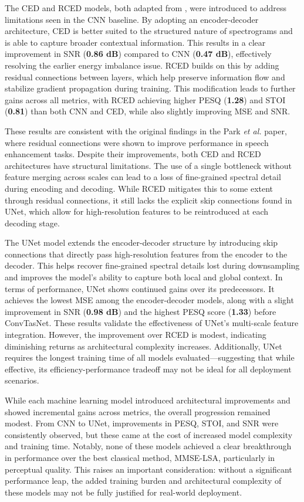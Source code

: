 The CED and RCED models, both adapted from \cite{park2017acoustic}, were introduced to address limitations seen in the CNN baseline. By adopting an encoder-decoder architecture, CED is better suited to the structured nature of spectrograms and is able to capture broader contextual information. This results in a clear improvement in SNR (\textbf{0.86 dB}) compared to CNN (\textbf{0.47 dB}), effectively resolving the earlier energy imbalance issue. RCED builds on this by adding residual connections between layers, which help preserve information flow and stabilize gradient propagation during training. This modification leads to further gains across all metrics, with RCED achieving higher PESQ (\textbf{1.28}) and STOI (\textbf{0.81}) than both CNN and CED, while also slightly improving MSE and SNR.

These results are consistent with the original findings in the Park \textit{et al.} paper, where residual connections were shown to improve performance in speech enhancement tasks. Despite their improvements, both CED and RCED architectures have structural limitations. The use of a single bottleneck without feature merging across scales can lead to a loss of fine-grained spectral detail during encoding and decoding. While RCED mitigates this to some extent through residual connections, it still lacks the explicit skip connections found in UNet, which allow for high-resolution features to be reintroduced at each decoding stage. 

The UNet model extends the encoder-decoder structure by introducing skip connections that directly pass high-resolution features from the encoder to the decoder. This helps recover fine-grained spectral details lost during downsampling and improves the model’s ability to capture both local and global context. In terms of performance, UNet shows continued gains over its predecessors. It achieves the lowest MSE among the encoder-decoder models, along with a slight improvement in SNR (\textbf{0.98 dB}) and the highest PESQ score (\textbf{1.33}) before ConvTasNet. These results validate the effectiveness of UNet’s multi-scale feature integration. However, the improvement over RCED is modest, indicating diminishing returns as architectural complexity increases. Additionally, UNet requires the longest training time of all models evaluated—suggesting that while effective, its efficiency-performance tradeoff may not be ideal for all deployment scenarios.

While each machine learning model introduced architectural improvements and showed incremental gains across metrics, the overall progression remained modest. From CNN to UNet, improvements in PESQ, STOI, and SNR were consistently observed, but these came at the cost of increased model complexity and training time. Notably, none of these models achieved a clear breakthrough in performance over the best classical method, MMSE-LSA, particularly in perceptual quality. This raises an important consideration: without a significant performance leap, the added training burden and architectural complexity of these models may not be fully justified for real-world deployment.

